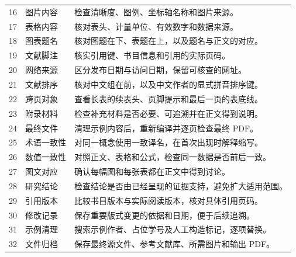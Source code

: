 {\begin{longtable}{p{}p{}p{}}
16 & 图片内容 & 检查清晰度、图例、坐标轴名称和图片来源。\\[4pt]
17 & 表格内容 & 核对表头、计量单位、有效数字和数据来源。\\[4pt]
18 & 图表题名 & 核对图题在下、表题在上，以及题名与正文的对应。\\[4pt]
19 & 文献脚注 & 核实引用键、书目信息和引用的实际页码。\\[4pt]
20 & 网络来源 & 区分发布日期与访问日期，保留可核查的网址。\\[4pt]
21 & 文献排序 & 核对中文组在前，以及中文作者的显式拼音排序键。\\[4pt]
22 & 跨页对象 & 查看长表的续表头、页脚提示和最后一页的表底线。\\[4pt]
23 & 附录材料 & 检查补充材料是否必要、可追溯并在正文得到说明。\\[4pt]
24 & 最终文件 & 清理示例内容后，重新编译并逐页检查最终 PDF。\\[4pt]
25 & 术语一致性 & 对同一概念使用一致译名，在首次出现时解释缩写。\\[4pt]
26 & 数值一致性 & 对照正文、表格和公式，检查同一数据是否前后一致。\\[4pt]
27 & 图文对应 & 确认每幅图和每张表都在正文中得到讨论。\\[4pt]
28 & 研究结论 & 检查结论是否由已经呈现的证据支持，避免扩大适用范围。\\[4pt]
29 & 引用版本 & 比较书目版本与实际阅读版本，核对具体引用页码。\\[4pt]
30 & 修改记录 & 保存重要版式变更的依据和日期，便于后续追溯。\\[4pt]
31 & 示例清理 & 搜索示例作者、占位学号及人工构造标记，逐项替换。\\[4pt]
32 & 文件归档 & 保存最终源文件、参考文献库、所需图片和输出 PDF。\\[4pt]
\end{longtable}
}
